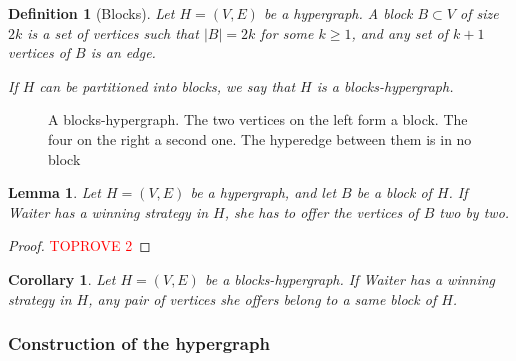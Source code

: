 \documentclass{article}
\def\rotateclockwise#1{
\newdimen\xrw
  \pgfextractx{\xrw}{#1}
  \newdimen\yrw
  \pgfextracty{\yrw}{#1}
\pgfpoint{\yrw}{-\xrw}
}
\def\rotatecounterclockwise#1{
\newdimen\xrcw
  \pgfextractx{\xrcw}{#1}
  \newdimen\yrcw
  \pgfextracty{\yrcw}{#1}
\pgfpoint{-\yrcw}{\xrcw}
}
\def\outsidespacerpgfclockwise#1#2#3{
\pgfpointscale{#3}{
    \rotateclockwise{
      \pgfpointnormalised{
        \pgfpointdiff{#1}{#2}}}}
}
\def\outsidespacerpgfcounterclockwise#1#2#3{
\pgfpointscale{#3}{
    \rotatecounterclockwise{
      \pgfpointnormalised{
        \pgfpointdiff{#1}{#2}}}}
}
\def\outsidepgfclockwise#1#2#3{
\pgfpointadd{#2}{\outsidespacerpgfclockwise{#1}{#2}{#3}}
}
\def\outsidepgfcounterclockwise#1#2#3{
\pgfpointadd{#2}{\outsidespacerpgfcounterclockwise{#1}{#2}{#3}}
}
\def\outside#1#2#3{
  ($ (#2) ! #3 ! -90 : (#1) $)
}
\def\cornerpgf#1#2#3#4{
\pgfextra{
    \pgfmathanglebetweenpoints{#2}{\outsidepgfcounterclockwise{#1}{#2}{#4}}
    \let\anglea\pgfmathresult
    \let\startangle\pgfmathresult

    \pgfmathanglebetweenpoints{#2}{\outsidepgfclockwise{#3}{#2}{#4}}
    \pgfmathparse{\pgfmathresult - \anglea}
    \pgfmathroundto{\pgfmathresult}
    \let\arcangle\pgfmathresult
    \ifthenelse{180=\arcangle \or 180<\arcangle}{
      \pgfmathparse{-360 + \arcangle}}{
      \pgfmathparse{\arcangle}}
    \let\deltaangle\pgfmathresult

    \newdimen\x
    \pgfextractx{\x}{\outsidepgfcounterclockwise{#1}{#2}{#4}}
    \newdimen\y
    \pgfextracty{\y}{\outsidepgfcounterclockwise{#1}{#2}{#4}}
  }
  -- (\x,\y) arc [start angle=\startangle, delta angle=\deltaangle, radius=#4]
}
\def\corner#1#2#3#4{
  \cornerpgf{\pgfpointanchor{#1}{center}}{\pgfpointanchor{#2}{center}}{\pgfpointanchor{#3}{center}}{#4}
}
\def\hedgeiii#1#2#3#4{
\outside{#1}{#2}{#4} \corner{#1}{#2}{#3}{#4} \corner{#2}{#3}{#1}{#4} \corner{#3}{#1}{#2}{#4} -- cycle
}
\def\hedgem#1#2#3#4{


  \outside{#1}{#2}{#4}
  \pgfextra{
    \def\hgnodea{#1}
    \def\hgnodeb{#2}
  }
  foreach \c in {#3} {
    \corner{\hgnodea}{\hgnodeb}{\c}{#4}
    \pgfextra{
      \global\let\hgnodea\hgnodeb
      \global\let\hgnodeb\c
    }
  }
  \corner{\hgnodea}{\hgnodeb}{#1}{#4}
  \corner{\hgnodeb}{#1}{#2}{#4}
  -- cycle
}
\def\hedgeii#1#2#3{
\hedgem{#1}{#2}{}{#3}
}
\newcommand{\hyp}{H}
\newcommand{\WS}{E}
\newcommand{\som}{V}
\newcommand{\hxf}{\hyp = (\som, \WS)}
\newcommand{\hedge}{edge\xspace}
\newtheorem{lemma}[theorem]{Lemma}
\newtheorem{corollary}[theorem]{Corollary}
\newtheorem{definition}[theorem]{Definition}
\begin{document}
\begin{definition}[Blocks] \label{definition: blocks in Client-Waiter}
Let $\hxf$ be a hypergraph. A {\em block} $B \subset \som$ of size $2k$ is a set of vertices such that $|B| = 2k$ for some $k \ge 1$, and any set of $k+1$ vertices of $B$ is an \hedge.

If $\hyp$ can be partitioned into blocks, we say that $\hyp$ is a {\em blocks-hypergraph}.
\end{definition} 

\begin{figure}[ht]
    \centering


    
    \caption{A blocks-hypergraph. The two vertices on the left form a block. The four on the right a second one. The hyperedge between them is in no block}
    \label{fig:block}
\end{figure} 
\begin{lemma}
    Let $\hxf$ be a hypergraph, and let $B$ be a block of $\hyp$. If Waiter has a winning strategy in $\hyp$, she has to offer the vertices of $B$ two by two.
\end{lemma}

\begin{proof}\textcolor{red}{TOPROVE 2}\end{proof}

\begin{corollary}\label{corollary: always play in blocks}
    Let $\hxf$ be a blocks-hypergraph. If Waiter has a winning strategy in $\hyp$, any pair of vertices she offers belong to a same block of $\hyp$.
\end{corollary}


\subsubsection{Construction of the hypergraph} \label{subsection construction client-waiter}
\end{document}
